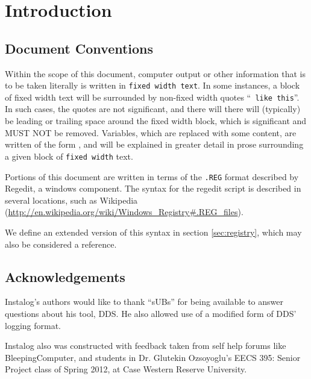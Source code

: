 \section{Introduction}
\subsection{Document Conventions}
Within the scope of this document, computer output or other information that is
to be taken literally is written in \texttt{fixed width text}. In some
instances, a block of fixed width text will be surrounded by non-fixed width
quotes ``\texttt{ like this}''. In such cases, the quotes are not significant,
and there will there will (typically) be leading or trailing space around the
fixed width block, which is significant and MUST NOT be removed. Variables,
which are replaced with some content, are written of the form , and
will be explained in greater detail in prose surrounding a given block of
\texttt{fixed width} text.

Portions of this document are written in terms of the \verb|.REG| format
described by Regedit, a windows component. The syntax for the regedit script is
described in several locations, such as Wikipedia
(\url{http://en.wikipedia.org/wiki/Windows_Registry#.REG_files}).

We define an extended version of this syntax in section \ref{sec:registry},
which may also be considered a reference.

\subsection{Acknowledgements}
Instalog's authors would like to thank ``sUBs'' for being available to answer
questions about his tool, DDS. He also allowed use of a modified form of DDS'
logging format.

Instalog also was constructed with feedback taken from self help forums like
BleepingComputer, and students in Dr. Glutekin Ozsoyoglu's EECS 395: Senior
Project class of Spring 2012, at Case Western Reserve University.